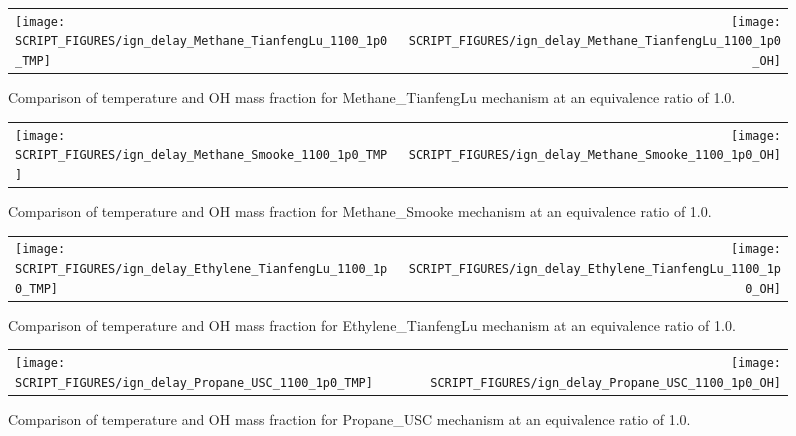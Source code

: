 \documentclass[11pt]{book}
\begin{document}
\begin{figure}[p]
\begin{tabular*}{\textwidth}{lr}
\texttt{[image: SCRIPT\_FIGURES/ign\_delay\_Methane\_TianfengLu\_1100\_1p0\_TMP]} &
\texttt{[image: SCRIPT\_FIGURES/ign\_delay\_Methane\_TianfengLu\_1100\_1p0\_OH]}
\end{tabular*}
\caption[Results of the  test cases]{Comparison of temperature and OH mass fraction for Methane\_TianfengLu mechanism at an equivalence ratio of 1.0.}
\label{fig:ign_delay_Methane_TianfengLu_phi_1.0}
\end{figure}

\begin{figure}[p]
\begin{tabular*}{\textwidth}{lr}
\texttt{[image: SCRIPT\_FIGURES/ign\_delay\_Methane\_Smooke\_1100\_1p0\_TMP]} &
\texttt{[image: SCRIPT\_FIGURES/ign\_delay\_Methane\_Smooke\_1100\_1p0\_OH]}
\end{tabular*}
\caption[Results of the  test cases]{Comparison of temperature and OH mass fraction for Methane\_Smooke mechanism at an equivalence ratio of 1.0.}
\label{fig:ign_delay_Methane_Smooke_phi_1.0}
\end{figure}

\begin{figure}[p]
\begin{tabular*}{\textwidth}{lr}
\texttt{[image: SCRIPT\_FIGURES/ign\_delay\_Ethylene\_TianfengLu\_1100\_1p0\_TMP]} &
\texttt{[image: SCRIPT\_FIGURES/ign\_delay\_Ethylene\_TianfengLu\_1100\_1p0\_OH]}
\end{tabular*}
\caption[Results of the  test cases]{Comparison of temperature and OH mass fraction for Ethylene\_TianfengLu mechanism at an equivalence ratio of 1.0.}
\label{fig:ign_delay_Ethylene_TianfengLu_phi_1.0}
\end{figure}

\begin{figure}[p]
\begin{tabular*}{\textwidth}{lr}
\texttt{[image: SCRIPT\_FIGURES/ign\_delay\_Propane\_USC\_1100\_1p0\_TMP]} &
\texttt{[image: SCRIPT\_FIGURES/ign\_delay\_Propane\_USC\_1100\_1p0\_OH]}
\end{tabular*}
\caption[Results of the  test cases]{Comparison of temperature and OH mass fraction for Propane\_USC mechanism at an equivalence ratio of 1.0.}
\label{fig:ign_delay_Propane_USC_phi_1.0}
\end{figure}
\end{document}
